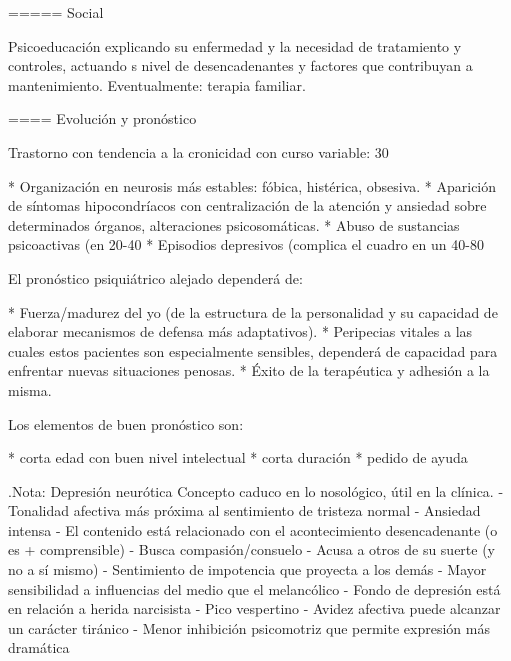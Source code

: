 \documentclass{scrbook}
\begin{document}
===== Social

Psicoeducación explicando su enfermedad y la necesidad de tratamiento y controles, actuando s nivel de desencadenantes y factores que contribuyan a mantenimiento. Eventualmente: terapia familiar.

==== Evolución y pronóstico

Trastorno con tendencia a la cronicidad con curso variable: 30%

* Organización en neurosis más estables: fóbica, histérica, obsesiva.
* Aparición de síntomas hipocondríacos con centralización de la atención y ansiedad sobre determinados órganos, alteraciones psicosomáticas.
* Abuso de sustancias psicoactivas (en 20-40%
* Episodios depresivos (complica el cuadro en un 40-80%

El pronóstico psiquiátrico alejado dependerá de:

* Fuerza/madurez del yo (de la estructura de la personalidad y su capacidad de elaborar mecanismos de defensa más adaptativos).
* Peripecias vitales a las cuales estos pacientes son especialmente sensibles, dependerá de capacidad para enfrentar nuevas situaciones penosas.
* Éxito de la terapéutica y adhesión a la misma.

Los elementos de buen pronóstico son:

* corta edad con buen nivel intelectual
* corta duración
* pedido de ayuda


.Nota: Depresión neurótica
Concepto caduco en lo nosológico, útil en la clínica.
- Tonalidad afectiva más próxima al sentimiento de tristeza normal
- Ansiedad intensa
- El contenido está relacionado con el acontecimiento desencadenante (o es + comprensible)
- Busca compasión/consuelo
- Acusa a otros de su suerte (y no a sí mismo)
- Sentimiento de impotencia que proyecta a los demás
- Mayor sensibilidad a influencias del medio que el melancólico
- Fondo de depresión está en relación a herida narcisista
- Pico vespertino
- Avidez afectiva puede alcanzar un carácter tiránico
- Menor inhibición psicomotriz que permite expresión más dramática
\end{document}
